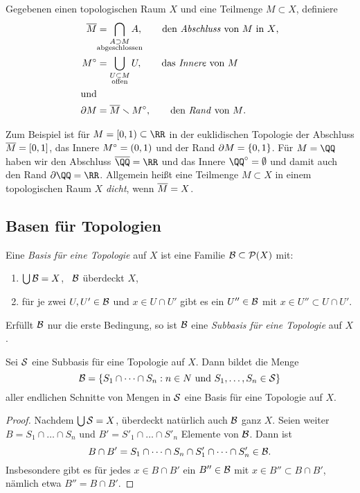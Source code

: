 \begin{definition}
Gegebenen einen topologischen Raum $X$ und eine Teilmenge $M\subset X$,
definiere
\begin{align*}
\cl{M} &= \bigcap_{\substack{A\supset M\\
\mathclap{\textnormal{abgeschlossen}}}}
A,\qquad\textnormal{den \emph{Abschluss} von $M$ in $X$,} \\
\Int{M} &= \bigcup_{\substack{U\subset M\\ \mathclap{\textnormal{offen}}}}
U,\qquad\textnormal{das \emph{Innere} von $M$} \\
\shortintertext{und}
\Bdry{M} &= \cl{M}\setminus\Int{M},\qquad\textnormal{den \emph{Rand} von $M$.}
\end{align*}
\end{definition}

Zum Beispiel ist für $M=[0,1)\subset\RR$ in der euklidischen Topologie der
Abschluss $\cl{M} = [0,1]$, das Innere $\Int{M} = (0,1)$ und der Rand $\Bdry{M}
= \{0,1\}$. Für $M=\QQ$ haben wir den Abschluss $\cl{\QQ} = \RR$ und das Innere
$\Int{\QQ} = \emptyset$ und damit auch den Rand $\Bdry{\QQ} = \RR$. Allgemein
heißt eine Teilmenge $M\subset X$ in einem topologischen Raum $X$ \emph{dicht},
wenn $\cl{M} = X$.

\subsection{Basen für Topologien}
\begin{definition}
Eine \emph{Basis für eine Topologie} auf $X$ ist eine Familie $\cal
B\subset\powerset{X}$ mit:
\begin{enumerate}
\item $\bigcup\cal B = X$, \ddh~$\cal B$ überdeckt $X$,
\item für je zwei $U,U'\in\cal B$ und $x\in U\cap U'$ gibt es ein $U''\in\cal
B$ mit $x\in U''\subset U\cap U'$.
\end{enumerate}
Erfüllt $\cal B$ nur die erste Bedingung, so ist $\cal B$ eine \emph{Subbasis
für eine Topologie} auf $X$.
\end{definition}

\begin{theorem}\label{thm:subbase-base}
Sei $\cal S$ eine Subbasis für eine Topologie auf $X$. Dann bildet die Menge
\[
\cal B = \{S_1\cap\dots\cap S_n : \textnormal{$n\in N$ und $S_1,\dots,S_n\in\cal S$}\}
\]
aller endlichen Schnitte von Mengen in $\cal S$ eine Basis für eine Topologie
auf $X$.
\end{theorem}
\begin{proof}
Nachdem $\bigcup \cal S = X$, überdeckt natürlich auch $\cal B$ ganz $X$. Seien
weiter $B = S_1 \cap \dots \cap S_n$ und $B' = S'_1 \cap\dots\cap S'_n$ Elemente
von $\cal B$. Dann ist
\[
B\cap B' = S_1\cap \dots\cap S_n\cap S'_1\cap\dots\cap S'_n\in\cal B.
\]
Insbesondere gibt es für jedes $x\in B\cap B'$ ein $B''\in\cal B$ mit $x\in
B''\subset B\cap B'$, nämlich etwa $B'' = B\cap B'$.
\end{proof}

